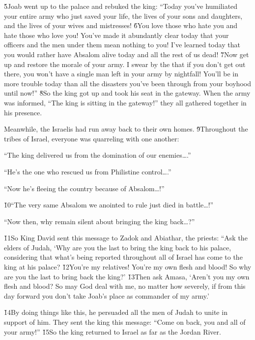 \v{5}Joab went up to the palace and rebuked the king: ``Today you've humiliated your entire army who just saved your life, the lives of your sons and daughters, and the lives of your wives and mistresses! \v{6}You love those who hate you and hate those who love you! You've made it abundantly clear today that your officers and the men under them mean nothing to you! I've learned today that you would rather have Absalom alive today and all the rest of us dead! \v{7}Now get up and restore the morale of your army. I swear by the  that if you don't get out there, you won't have a single man left in your army by nightfall! You'll be in more trouble today than all the disasters you've been through from your boyhood until now!'' \v{8}So the king got up and took his seat in the gateway. When the army was informed, ``The king is sitting in the gateway!'' they all gathered together in his presence.

Meanwhile, the Israelis had run away back to their own homes. \v{9}Throughout the tribes of Israel, everyone was quarreling with one another:

``The king delivered us from the domination of our enemies{\ldots}.''

``He's the one who rescued us from Philistine control{\ldots}.''

``Now he's fleeing the country because of Absalom{\ldots}!''

\v{10}``The very same Absalom we anointed to rule just died in battle{\ldots}!''

``Now then, why remain silent about bringing the king back{\ldots}?''

\v{11}So King David sent this message to Zadok and Abiathar, the priests: ``Ask the elders of Judah, `Why are you the last to bring the king back to his palace, considering that what's being reported throughout all of Israel has come to the king at his palace? \v{12}You're my relatives! You're my own flesh and blood! So why are you the last to bring back the king?' \v{13}Then ask Amasa, `Aren't you my own flesh and blood? So may God deal with me, no matter how severely, if from this day forward you don't take Joab's place as commander of my army.'

\v{14}By doing things like this, he persuaded all the men of Judah to unite in support of him. They sent the king this message: ``Come on back, you and all of your army!'' \v{15}So the king returned to Israel as far as the Jordan River.

